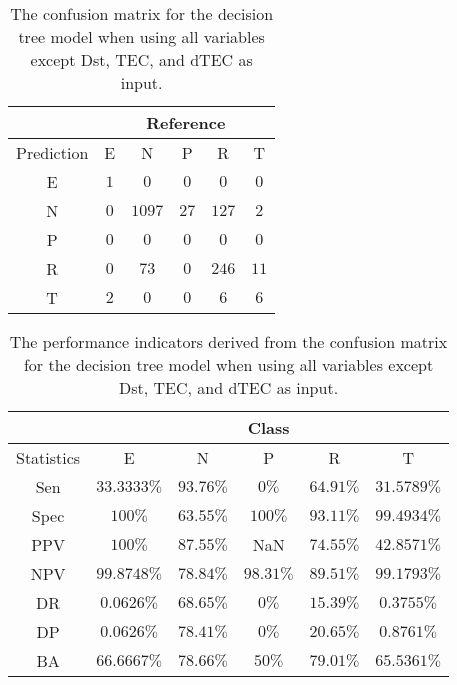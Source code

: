 \begin{table}[!ht]
	\centering
	\begin{tabular}{|c|c|c|c|c|c|}
		\hline
		 & \multicolumn{5}{|c|}{Reference} \\ \hline
		 Prediction & E & N & P & R & T \\ \hline
		 E & $1$ & $0$ & $0$ & $0$ & $0$ \\ \hline
		 N & $0$ & $1097$ & $27$ & $127$ & $2$ \\ \hline
		 P & $0$ & $0$ & $0$ & $0$ & $0$ \\ \hline
		 R & $0$ & $73$ & $0$ & $246$ & $11$ \\ \hline
		 T & $2$ & $0$ & $0$ & $6$ & $6$ \\ \hline
	\end{tabular}
	\caption{The confusion matrix for the decision tree model when using all variables except Dst, TEC, and dTEC as input.}
	\label{tab:cm:noTEC:C5.0}
\end{table}

\begin{table}[!ht]
	\centering
	\begin{tabular}{|c|c|c|c|c|c|}
		\hline
		 & \multicolumn{5}{c|}{Class} \\ \hline
		Statistics & E & N & P & R & T \\ \hline
		Sen & $33.3333\%$ & $93.76\%$ & $0\%$ & $64.91\%$ & $31.5789\%$ \\ \hline
		Spec & $100\%$ & $63.55\%$ & $100\%$ & $93.11\%$ & $99.4934\%$ \\ \hline
		PPV & $100\%$ & $87.55\%$ & NaN & $74.55\%$ & $42.8571\%$ \\ \hline
		NPV & $99.8748\%$ & $78.84\%$ & $98.31\%$ & $89.51\%$ & $99.1793\%$ \\ \hline
		DR & $0.0626\%$ & $68.65\%$ & $0\%$ & $15.39\%$ & $0.3755\%$ \\ \hline
		DP & $0.0626\%$ & $78.41\%$ & $0\%$ & $20.65\%$ & $0.8761\%$ \\ \hline
		BA & $66.6667\%$ & $78.66\%$ & $50\%$ & $79.01\%$ & $65.5361\%$ \\ \hline
	\end{tabular}
	\caption{The performance indicators derived from the confusion matrix for the decision tree model when using all variables except Dst, TEC, and dTEC as input.}
	\label{tab:cs:reverse:noTEC:C5.0}
\end{table}

